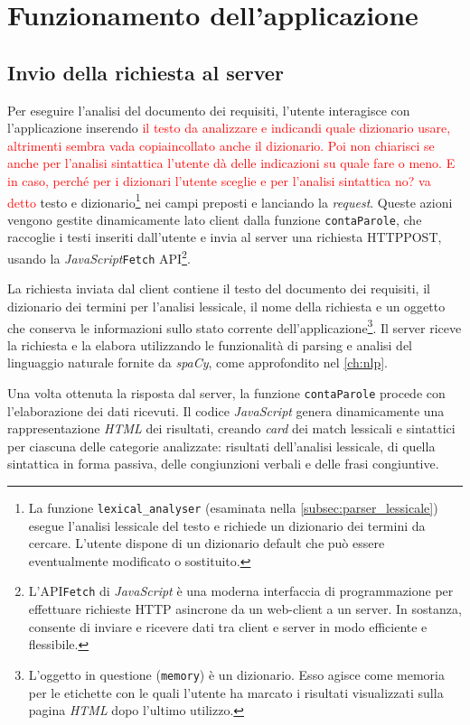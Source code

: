 \documentclass[12pt]{report}
\newcommand{\torevise}[1]{\textcolor{red}{#1}}
\newcommand{\javascript}{\textsl{JavaScript}\xspace}
\newcommand{\spacy}{\textsl{spaCy}\xspace}
\newcommand{\html}{\textsl{HTML}\xspace}
\newcommand{\api}{\textsf{API}\xspace}
\newcommand{\http}{\textsf{HTTP}\xspace}
\newcommand{\post}{\textsf{POST}\xspace}
\begin{document}
\section{Funzionamento dell'applicazione}
\subsection{Invio della richiesta al server}
Per eseguire l'analisi del documento dei requisiti, l'utente interagisce con l'applicazione inserendo  \torevise{il testo da analizzare e indicandi quale dizionario usare, altrimenti sembra vada copiaincollato anche il dizionario. Poi non chiarisci se anche per l'analisi sintattica l'utente dà delle indicazioni su quale fare o meno. E in caso, perché per i dizionari l'utente sceglie e per l'analisi sintattica no? va detto} testo e dizionario\footnote{La funzione \texttt{lexical\_analyser} (esaminata nella \cref{subsec:parser_lessicale}) esegue l'analisi lessicale del testo e richiede un dizionario dei termini da cercare. L'utente dispone di un dizionario default che può essere eventualmente modificato o sostituito.} nei campi preposti e lanciando la \textit{request}. Queste azioni vengono gestite dinamicamente lato client dalla funzione \texttt{contaParole}, che raccoglie i testi inseriti dall'utente e invia al server una richiesta \http \post, usando la \javascript \texttt{Fetch} \api\footnote{L'\api \texttt{Fetch} di \javascript è una moderna interfaccia di programmazione per effettuare richieste \http asincrone da un web-client a un server. In sostanza, consente di inviare e ricevere dati tra client e server in modo efficiente e flessibile.}.

La richiesta inviata dal client contiene il testo del documento dei requisiti, il dizionario dei termini per l'analisi lessicale, il nome della richiesta e un oggetto che conserva le informazioni sullo stato corrente dell'applicazione\footnote{L'oggetto in questione (\texttt{memory}) è un dizionario. Esso agisce come memoria per le etichette con le quali l'utente ha marcato i risultati visualizzati sulla pagina \html dopo l'ultimo utilizzo.}. Il server riceve la richiesta e la elabora utilizzando le funzionalità di parsing e analisi del linguaggio naturale fornite da \spacy, come approfondito nel \cref{ch:nlp}.

Una volta ottenuta la risposta dal server, la funzione \texttt{contaParole} procede con l'elaborazione dei dati ricevuti. Il codice \javascript genera dinamicamente una rappresentazione \html dei risultati, creando \textit{card} dei match lessicali e sintattici per ciascuna delle categorie analizzate: risultati dell'analisi lessicale, di quella sintattica in forma passiva, delle congiunzioni verbali e delle frasi congiuntive.
\end{document}
